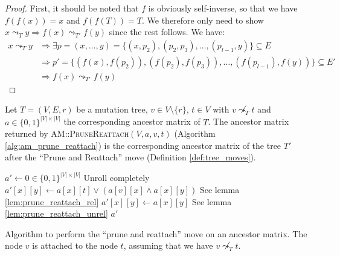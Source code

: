 \begin{proof}
    First, it should be noted that $f$ is obviously self-inverse, so that we have $f(f(x)) = x$ and $f(f(T)) = T$. We therefore only need to show $x \leadsto_{T} y \Rightarrow f(x) \leadsto_{T'} f(y)$ since the rest follows. We have:
    \begin{align*}
        x \leadsto_T y &\Rightarrow \exists p = (x, \dots, y) = \{(x, p_2), (p_2, p_3), \dots, (p_{l-1}, y)\} \subseteq E \\
        &\Rightarrow p' = \{(f(x), f(p_2)), (f(p_2), f(p_3)), \dots, (f(p_{l-1}), f(y))\} \subseteq E' \\
        &\Rightarrow f(x) \leadsto_{T'} f(y)
    \end{align*}
\end{proof}

\begin{theorem}
    \label{theo:prune_reattach_correctness}
    Let $T = (V, E, r)$ be a mutation tree, $v \in V \setminus \{r\}$, $t \in V$ with $v \not\leadsto_T t$ and $a \in \{0,1\}^{|V| \times |V|}$ the corresponding ancestor matrix of $T$. The ancestor matrix returned by \textsc{AM::PruneReattach}$(V, a, v, t)$ (Algorithm \ref{alg:am_prune_reattach}) is the corresponding ancestor matrix of the tree $T'$ after the ``Prune and Reattach'' move (Definition \ref{def:tree_moves}).
\end{theorem}

\begin{algorithm}
    \begin{algorithmic}[1]
            \State $a' \leftarrow 0 \in \{0,1\}^{|V| \times |V|}$
                 \Comment Unroll completely
                        \State $a'[x][y] \leftarrow a[x][t] \vee (a[v][x] \wedge a[x][y])$ \Comment See lemma \ref{lem:prune_reattach_rel}
                    \Else
                        \State $a'[x][y] \leftarrow a[x][y]$ \Comment See lemma \ref{lem:prune_reattach_unrel}
                    \EndIf
                \EndFor
            \EndFor
            \State \Return $a'$
        \EndFunction
    \end{algorithmic}
    \caption{Algorithm to perform the ``prune and reattach'' move on an ancestor matrix. The node $v$ is attached to the node $t$, assuming that we have $v \not\leadsto_T t$.}
    \label{alg:am_prune_reattach}
\end{algorithm}

